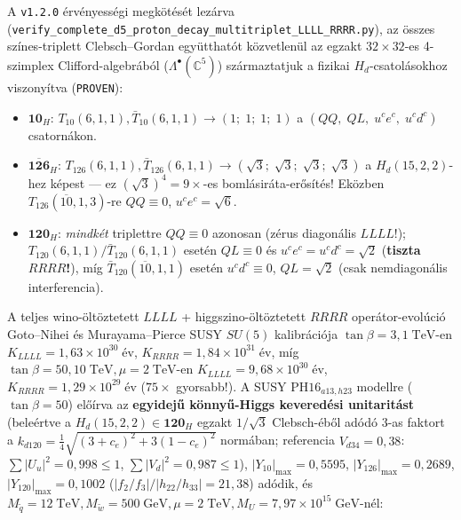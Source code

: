 \documentclass[11pt,a4paper]{article}
\begin{document}
\begin{enumerate}
    A \texttt{v1.2.0} érvényességi megkötését lezárva (\texttt{verify\_\allowbreak complete\_\allowbreak d5\_\allowbreak proton\_\allowbreak decay\_\allowbreak multitriplet\_\allowbreak LLLL\_\allowbreak RRRR.py}), az összes színes-triplett Clebsch--Gordan együtthatót közvetlenül az egzakt $32\times 32$-es 4-szimplex Clifford-algebrából ($\Lambda^\bullet(\mathbb{C}^5)$) származtatjuk a fizikai $H_d$-csatolásokhoz viszonyítva (\texttt{PROVEN}):
    \begin{itemize}
        \item $\mathbf{10}_H$: $T_{10}(6,1,1), \bar T_{10}(6,1,1) \to (1;\; 1;\; 1;\; 1)$ a $(QQ,\; QL,\; u^c e^c,\; u^c d^c)$ csatornákon.
        \item $\overline{\mathbf{126}}_H$: $T_{126}(6,1,1), \bar T_{126}(6,1,1) \to (\sqrt{3};\; \sqrt{3};\; \sqrt{3};\; \sqrt{3})$ a $H_d(15,2,2)$-hez képest --- ez $(\sqrt{3})^4 = 9\times$-es bomlásiráta-erősítés! Eközben $T_{126}(\overline{10},1,3)$-re $QQ \equiv 0$, $u^c e^c = \sqrt{6}$.
        \item $\mathbf{120}_H$: \emph{mindkét} triplettre $QQ \equiv 0$ azonosan (zérus diagonális $LLLL$!); $T_{120}(6,1,1)/\bar T_{120}(6,1,1)$ esetén $QL \equiv 0$ és $u^c e^c = u^c d^c = \sqrt{2}$ (\textbf{tiszta $RRRR$!}), míg $\bar T_{120}(\overline{10},1,1)$ esetén $u^c d^c \equiv 0$, $QL = \sqrt{2}$ (csak nemdiagonális interferencia).
    \end{itemize}
    A teljes wino-öltöztetett $LLLL$ + higgszino-öltöztetett $RRRR$ operátor-evolúció Goto--Nihei \cite{GotoNihei1999} és Murayama--Pierce \cite{Murayama2002} SUSY $SU(5)$ kalibrációja $\tan\beta=3, 1\;\mathrm{TeV}$-en $K_{LLLL} = 1{,}63\times 10^{30}\;\text{év}$, $K_{RRRR} = 1{,}84\times 10^{31}\;\text{év}$, míg $\tan\beta=50, 10\;\mathrm{TeV}, \mu=2\;\mathrm{TeV}$-en $K_{LLLL} = 9{,}68\times 10^{30}\;\text{év}$, $K_{RRRR} = 1{,}29\times 10^{29}\;\text{év}$ ($75\times$ gyorsabb!). A SUSY $\mathrm{PH16}_{a13,h23}$ modellre ($\tan\beta = 50$) előírva az \textbf{egyidejű könnyű-Higgs keveredési unitaritást} (beleértve a $H_d(15,2,2)\in\mathbf{120}_H$ egzakt $1/\sqrt{3}$ Clebsch-éből adódó $3$-as faktort a $k_{d120}=\frac{1}{4}\sqrt{(3+c_e)^2+3(1-c_e)^2}$ normában; referencia $V_{d34}=0{,}38$: $\sum|U_u|^2=0{,}998 \le 1$, $\sum|V_d|^2=0{,}987 \le 1$), $|Y_{10}|_{\max}=0{,}5595$, $|Y_{126}|_{\max}=0{,}2689$, $|Y_{120}|_{\max}=0{,}1002$ ($|f_2/f_3|/|h_{22}/h_{33}| = 21{,}38$) adódik, és $M_{\tilde q} = 12\;\mathrm{TeV}, M_{\tilde w} = 500\;\mathrm{GeV}, \mu = 2\;\mathrm{TeV}, M_U = 7{,}97\times 10^{15}\;\mathrm{GeV}$-nél:
    \begin{itemize}

\end{itemize}
\end{enumerate}
\end{document}
